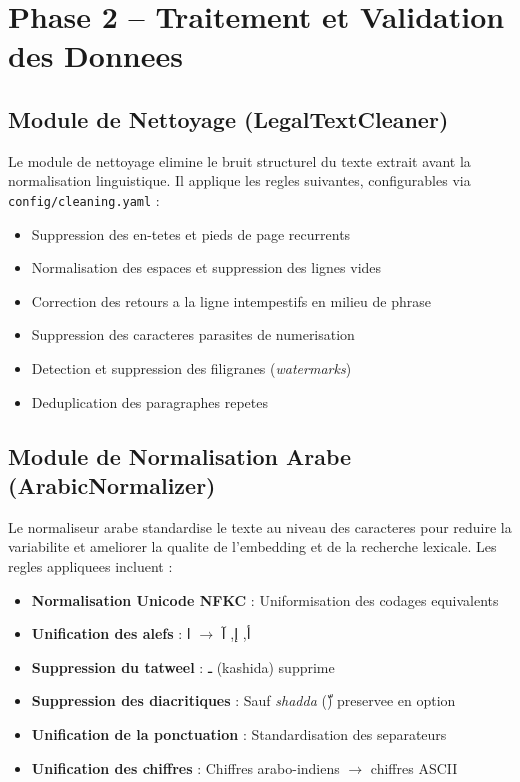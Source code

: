 \section{Phase 2 -- Traitement et Validation des Donnees}

\subsection{Module de Nettoyage (LegalTextCleaner)}

Le module de nettoyage elimine le bruit structurel du texte extrait avant la normalisation linguistique. Il applique les regles suivantes, configurables via \texttt{config/cleaning.yaml} :

\begin{itemize}
    \item Suppression des en-tetes et pieds de page recurrents
    \item Normalisation des espaces et suppression des lignes vides
    \item Correction des retours a la ligne intempestifs en milieu de phrase
    \item Suppression des caracteres parasites de numerisation
    \item Detection et suppression des filigranes (\textit{watermarks})
    \item Deduplication des paragraphes repetes
\end{itemize}

\subsection{Module de Normalisation Arabe (ArabicNormalizer)}

Le normaliseur arabe standardise le texte au niveau des caracteres pour reduire la variabilite et ameliorer la qualite de l'embedding et de la recherche lexicale. Les regles appliquees incluent :

\begin{itemize}
    \item \textbf{Normalisation Unicode NFKC} : Uniformisation des codages equivalents
    \item \textbf{Unification des alefs} : \textarabic{أ}, \textarabic{إ}, \textarabic{آ} $\to$ \textarabic{ا}
    \item \textbf{Suppression du tatweel} : \textarabic{ـ} (kashida) supprime
    \item \textbf{Suppression des diacritiques} : Sauf \textit{shadda} (\textarabic{ّ}) preservee en option
    \item \textbf{Unification de la ponctuation} : Standardisation des separateurs
    \item \textbf{Unification des chiffres} : Chiffres arabo-indiens $\to$ chiffres ASCII
\end{itemize}

